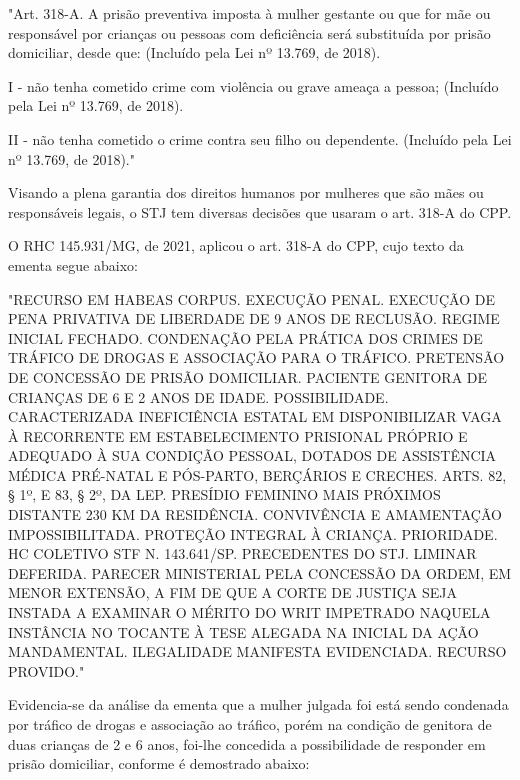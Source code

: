\noindent
\begin{flushleft}
\setlength{\leftskip}{4cm}
\small
"Art. 318-A.  A prisão preventiva imposta à mulher gestante ou que for mãe ou responsável por crianças ou pessoas com deficiência será substituída por prisão domiciliar, desde que: (Incluído pela Lei nº 13.769, de 2018).

I - não tenha cometido crime com violência ou grave ameaça a pessoa;              (Incluído pela Lei nº 13.769, de 2018).

II - não tenha cometido o crime contra seu filho ou dependente. (Incluído pela Lei nº 13.769, de 2018)." \cite{cpp}
\end{flushleft}

Visando a plena garantia dos direitos humanos por mulheres que são mães ou responsáveis legais, o STJ tem diversas decisões que usaram o art. 318-A do CPP. 

O RHC 145.931/MG, de 2021, aplicou o art. 318-A do CPP, cujo texto da ementa segue abaixo:

\noindent
\begin{flushleft}
\setlength{\leftskip}{4cm}
\small
"RECURSO EM HABEAS CORPUS. EXECUÇÃO PENAL.	EXECUÇÃO DE PENA PRIVATIVA DE LIBERDADE DE 9 ANOS DE RECLUSÃO. REGIME INICIAL FECHADO. CONDENAÇÃO PELA PRÁTICA DOS CRIMES DE TRÁFICO DE DROGAS E ASSOCIAÇÃO PARA O TRÁFICO. PRETENSÃO DE CONCESSÃO DE PRISÃO DOMICILIAR. PACIENTE GENITORA DE CRIANÇAS DE 6 E 2 ANOS DE IDADE. POSSIBILIDADE. CARACTERIZADA INEFICIÊNCIA ESTATAL EM DISPONIBILIZAR VAGA À RECORRENTE EM ESTABELECIMENTO PRISIONAL PRÓPRIO E ADEQUADO À SUA CONDIÇÃO PESSOAL, DOTADOS DE ASSISTÊNCIA MÉDICA PRÉ-NATAL E PÓS-PARTO, BERÇÁRIOS E CRECHES. ARTS. 82, § 1º, E 83, § 2º, DA LEP. PRESÍDIO FEMININO MAIS PRÓXIMOS DISTANTE 230 KM DA RESIDÊNCIA. CONVIVÊNCIA E AMAMENTAÇÃO IMPOSSIBILITADA. PROTEÇÃO INTEGRAL À CRIANÇA. PRIORIDADE. HC COLETIVO STF N. 143.641/SP. PRECEDENTES DO STJ. LIMINAR DEFERIDA. PARECER MINISTERIAL PELA CONCESSÃO DA ORDEM, EM MENOR EXTENSÃO, A FIM DE QUE A CORTE DE JUSTIÇA SEJA INSTADA A EXAMINAR O MÉRITO DO WRIT IMPETRADO NAQUELA INSTÂNCIA NO TOCANTE À TESE ALEGADA NA INICIAL DA AÇÃO MANDAMENTAL. ILEGALIDADE MANIFESTA 	EVIDENCIADA. RECURSO PROVIDO." \cite{rhc145931}
\end{flushleft}

Evidencia-se da análise da ementa que a mulher julgada foi está sendo condenada por tráfico de drogas e associação ao tráfico, porém na condição de genitora de duas crianças de 2 e 6 anos, foi-lhe concedida a possibilidade de responder em prisão domiciliar, conforme é demostrado abaixo:

